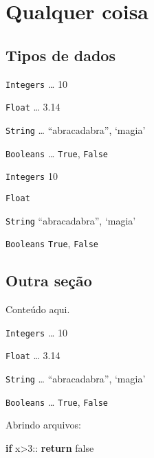 \documentclass{article}
\newenvironment{Shaded}{}{}
\newcommand{\ControlFlowTok}[1]{\textcolor[rgb]{0.00,0.44,0.13}{\textbf{#1}}}
\newcommand{\DecValTok}[1]{\textcolor[rgb]{0.25,0.63,0.44}{#1}}
\newcommand{\NormalTok}[1]{#1}
\newcommand{\OperatorTok}[1]{\textcolor[rgb]{0.40,0.40,0.40}{#1}}
\begin{document}
\section{Qualquer coisa}

\begin{multicols*}{4}


\subsectionfont{\color{green}}

\hypertarget{tipos-de-dados}{%
\subsection*{Tipos de dados}\label{tipos-de-dados}}

\color{DarkGreen}


\texttt{Integers} \ldots{} 10

\texttt{Float} \ldots{} 3.14

\texttt{String} \ldots{} ``abracadabra'', `magia'

\texttt{Booleans} \ldots{} \texttt{True}, \texttt{False}



\texttt{Integers} \hfill 10

\texttt{Float} 

\texttt{String} \hrulefill ``abracadabra'', `magia'

\texttt{Booleans} \hfill \texttt{True}, \texttt{False}


\subsectionfont{\color{Grey}}

\subsection*{Outra seção}

\color{DarkGrey}

Conteúdo aqui.


\texttt{Integers} \ldots{} 10

\texttt{Float} \ldots{} 3.14

\texttt{String} \ldots{} ``abracadabra'', `magia'

\texttt{Booleans} \ldots{} \texttt{True}, \texttt{False}

Abrindo arquivos:

\begin{Shaded}
\begin{Highlighting}[]
\ControlFlowTok{if}\NormalTok{ x}\OperatorTok{>}\DecValTok{3}\NormalTok{::}
   \ControlFlowTok{return}\NormalTok{ false}
\end{Highlighting}
\end{Shaded}


\end{multicols*}
\end{document}
